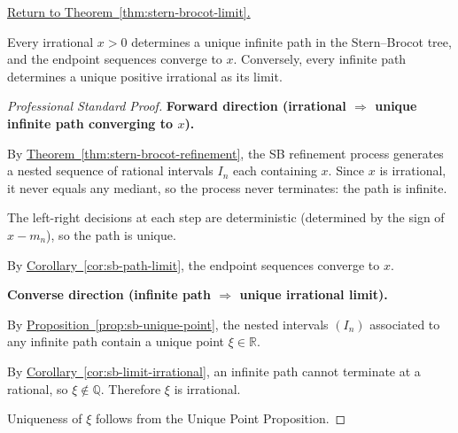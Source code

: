
\newpage
{}
\label{prf:stern-brocot-limit}

\begin{remark*}[Return]
\hyperref[thm:stern-brocot-limit]{Return to Theorem~\ref*{thm:stern-brocot-limit}.}
\end{remark*}

\begin{theorem*}
Every irrational $x > 0$ determines a unique infinite path in the
Stern--Brocot tree, and the endpoint sequences converge to $x$.
Conversely, every infinite path determines a unique positive irrational
as its limit.
\end{theorem*}

\begin{proof}[Professional Standard Proof]
\LRAProofBodyStart
\textbf{Forward direction (irrational $\Rightarrow$ unique infinite path
converging to $x$).}

By \hyperref[thm:stern-brocot-refinement]{Theorem~\ref*{thm:stern-brocot-refinement}},
the SB refinement process generates a nested sequence of rational intervals
$I_n$ each containing $x$.  Since $x$ is irrational, it never equals any
mediant, so the process never terminates: the path is infinite.

The left-right decisions at each step are deterministic (determined by the
sign of $x - m_n$), so the path is unique.

By \hyperref[cor:sb-path-limit]{Corollary~\ref*{cor:sb-path-limit}},
the endpoint sequences converge to $x$.

\textbf{Converse direction (infinite path $\Rightarrow$ unique irrational limit).}

By \hyperref[prop:sb-unique-point]{Proposition~\ref*{prop:sb-unique-point}},
the nested intervals $(I_n)$ associated to any infinite path contain a
unique point $\xi \in \mathbb{R}$.

By \hyperref[cor:sb-limit-irrational]{Corollary~\ref*{cor:sb-limit-irrational}},
an infinite path cannot terminate at a rational, so $\xi \notin \mathbb{Q}$.
Therefore $\xi$ is irrational.

Uniqueness of $\xi$ follows from the Unique Point Proposition.
\end{proof}


